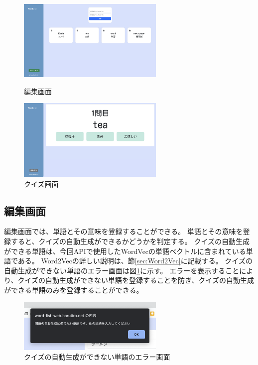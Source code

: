 \documentclass[11pt,a4paper]{jsarticle}
\begin{document}
\begin{figure}[htbp]
    \begin{minipage}{0.5\hsize}
        \begin{center}
            \includegraphics[width=70mm]{./img/edit_screen.png}
        \end{center}
        \caption{編集画面}
    \end{minipage}
    \begin{minipage}{0.5\hsize}
        \begin{center}
            \includegraphics[width=70mm]{./img/quiz_screen.png}
        \end{center}
        \caption{クイズ画面}
    \end{minipage}
\end{figure}

\subsection{編集画面}
編集画面では、単語とその意味を登録することができる。
単語とその意味を登録すると、クイズの自動生成ができるかどうかを判定する。
クイズの自動生成ができる単語は、今回APIで使用したWordVecの単語ベクトルに含まれている単語である。
Word2Vecの詳しい説明は、節\ref{sec:Word2Vec}に記載する。
クイズの自動生成ができない単語のエラー画面は図\ref{fig:quiz_error}に示す。
エラーを表示することにより、クイズの自動生成ができない単語を登録することを防ぎ、クイズの自動生成ができる単語のみを登録することができる。

\begin{figure}[htbp]
    \begin{center}
        \includegraphics[width=70mm]{./img/error_popup.png}
    \end{center}
    \caption{クイズの自動生成ができない単語のエラー画面}
    \label{fig:quiz_error}
\end{figure}
\end{document}
